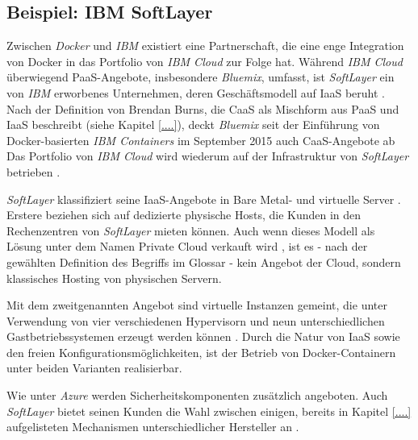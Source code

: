 \documentclass[../main.tex]{subfiles}
\begin{document}
    \subsection{Beispiel: IBM SoftLayer}
      Zwischen \emph{Docker} und \emph{IBM} existiert eine Partnerschaft, die eine enge Integration von Docker in das Portfolio von \emph{IBM Cloud} zur Folge hat. Während \emph{IBM Cloud} überwiegend PaaS-Angebote, insbesondere \emph{Bluemix}, umfasst, ist \emph{SoftLayer} ein von \emph{IBM} erworbenes Unternehmen, deren Geschäftsmodell auf IaaS beruht \cite{https://developer.ibm.com/bluemix/2015/06/22/ibm-containers-on-bluemix/}. Nach der Definition von Brendan Burns, die CaaS als Mischform aus PaaS und IaaS beschreibt (siehe Kapitel \ref{....}), deckt \emph{Bluemix} seit der Einführung von Docker-basierten \emph{IBM Containers} im September 2015 auch CaaS-Angebote ab %
      Das Portfolio von \emph{IBM Cloud} wird wiederum auf der Infrastruktur von \emph{SoftLayer} betrieben \cite{https://www-03.ibm.com/press/us/en/pressrelease/45597.wss}.

      \emph{SoftLayer} klassifiziert seine IaaS-Angebote in \glqq{}Bare Metal\grqq{}- und virtuelle Server \cite{http://www.softlayer.com/info/container-hosting}. Erstere beziehen sich auf dedizierte physische Hosts, die Kunden in den Rechenzentren von \emph{SoftLayer} mieten können. Auch wenn dieses Modell als Lösung unter dem Namen \glqq{}Private Cloud\grqq{} verkauft wird \cite{http://www.softlayer.com/PRIVATE-CLOUDS}, ist es - nach der gewählten Definition des Begriffs im Glossar - kein Angebot der Cloud, sondern klassisches Hosting von physischen Servern.

      Mit dem zweitgenannten Angebot sind virtuelle Instanzen gemeint, die unter Verwendung von vier verschiedenen Hypervisorn und neun unterschiedlichen Gastbetriebssystemen erzeugt werden können \cite{http://www.softlayer.com/software}. Durch die Natur von IaaS sowie den freien Konfigurationsmöglichkeiten, ist der Betrieb von Docker-Containern unter beiden Varianten realisierbar.

      Wie unter \emph{Azure} werden Sicherheitskomponenten zusätzlich angeboten. Auch \emph{SoftLayer} bietet seinen Kunden die Wahl zwischen einigen, bereits in Kapitel \ref{....} aufgelisteten Mechanismen unterschiedlicher Hersteller an \cite{http://www.softlayer.com/SECURITY-SOFTWARE}.
\end{document}
